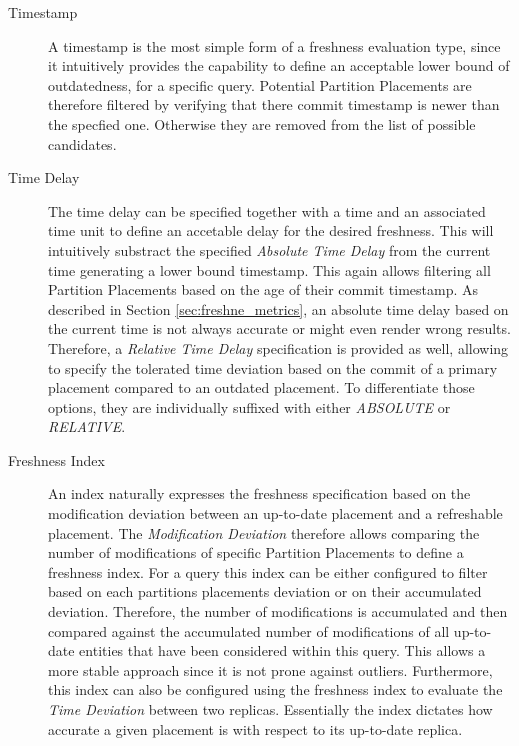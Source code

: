 \begin{description}
    \item[Timestamp] A timestamp is the most simple form of a freshness evaluation type, since it intuitively provides the capability to define 
    an acceptable lower bound of outdatedness, for a specific query. Potential Partition Placements are therefore filtered by verifying that there commit timestamp is newer
    than the specfied one. Otherwise they are removed from the list of possible candidates.
    
    \item[Time Delay]
    The time delay can be specified together with a time and an associated time unit to define an accetable delay for the desired freshness. 
    This will intuitively substract the specified \emph{Absolute Time Delay} from the current time generating a lower bound timestamp. 
    This again allows filtering all Partition Placements based on the age of their commit timestamp.
    As described in Section \ref{sec:freshne_metrics}, an absolute time delay based on the current time is not always accurate or might even render wrong results.
    Therefore, a \emph{Relative Time Delay} specification is provided as well, allowing to specify the tolerated time deviation based on the commit of a primary placement 
    compared to an outdated placement. To differentiate those options, they are individually suffixed with either \emph{ABSOLUTE} or  \emph{RELATIVE}.

    \item[Freshness Index]
    An index naturally expresses the freshness specification based on the modification deviation between an up-to-date placement
    and a refreshable placement. The \emph{Modification Deviation} therefore allows comparing the number of modifications of specific Partition Placements
    to define a freshness index. For a query this index can be either configured to filter based on each partitions placements deviation or on their accumulated deviation.
    Therefore, the number of modifications is accumulated and then compared against the accumulated number of modifications 
    of all up-to-date entities that have been considered within this query. This allows a more stable approach since it is not prone against outliers. 
    Furthermore, this index can also be configured using the freshness index to evaluate the \emph{Time Deviation} between two replicas. 
    Essentially the index dictates how accurate a given placement is with respect to its up-to-date replica.
    
\end{description}

